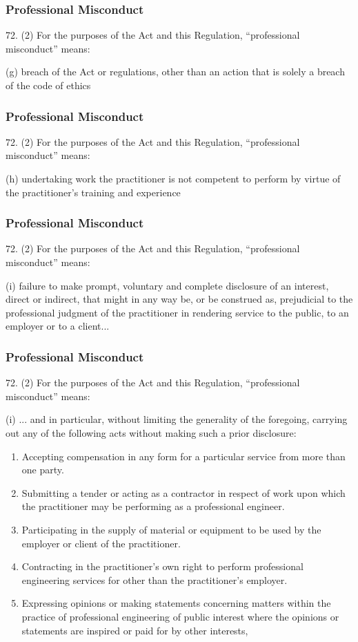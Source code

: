\begin{frame}
\frametitle{Professional Misconduct}

72. (2) For the purposes of the Act and this Regulation, ``professional misconduct'' means:

(g) breach of the Act or regulations, other than an action that is  solely a breach of the code of ethics

\end{frame}

\begin{frame}
\frametitle{Professional Misconduct}

72. (2) For the purposes of the Act and this Regulation, ``professional misconduct'' means:

(h) undertaking work the practitioner is not competent to perform  by virtue of the practitioner's training and experience

\end{frame}

\begin{frame}
\frametitle{Professional Misconduct}

72. (2) For the purposes of the Act and this Regulation, ``professional misconduct'' means:

(i)  failure to make prompt, voluntary and complete disclosure of  an interest, direct or indirect, that might in any way be, or be  construed as, prejudicial to the professional judgment of the  practitioner in rendering service to the public, to an employer or  to a client...

\end{frame}


\begin{frame}
\frametitle{Professional Misconduct}

72. (2) For the purposes of the Act and this Regulation, ``professional misconduct'' means:

(i)  ... and in particular, without limiting the generality of the  foregoing, carrying out any of the following acts without making  such a prior disclosure:

\begin{enumerate}
\item Accepting compensation in any form for a particular service from more than one party.
\item Submitting a tender or acting as a contractor in respect of work upon which the practitioner may be performing as a professional engineer.
\item Participating in the supply of material or equipment to be used by the employer or client of the practitioner.
\item Contracting in the practitioner's own right to perform professional engineering services for other than the practitioner's employer.
\item Expressing opinions or making statements concerning matters within the practice of professional engineering of public interest where the opinions or statements are inspired or paid for by other interests,
\end{enumerate}


\end{frame}



